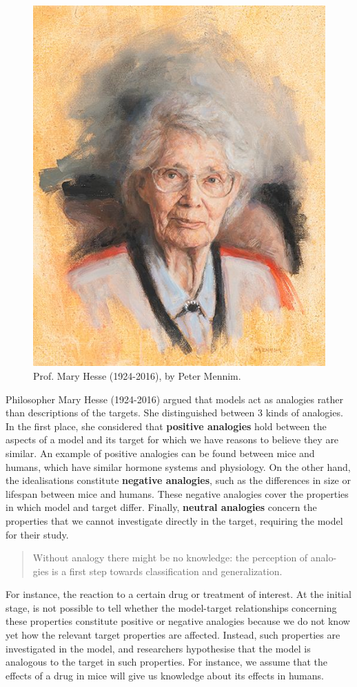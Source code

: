 \documentclass[
]{book}
\begin{document}
\begin{figure}  
 \begin{center}
    \includegraphics[width=.33\textwidth]{Figures/mary-hesse.jpeg}  
  \captionsetup{labelformat=empty}
  \caption{Prof. Mary Hesse (1924-2016), by Peter Mennim.} 
\end{center}
\end{figure}
\addtocounter{figure}{-1}

Philosopher Mary Hesse (1924-2016) argued that models act as analogies rather than descriptions of the targets. She distinguished between 3 kinds of analogies. In the first place, she considered that \textbf{positive analogies} hold between the aspects of a model and its target for which we have reasons to believe they are similar. An example of positive analogies can be found between mice and humans, which have similar hormone systems and physiology. On the other hand, the idealisations constitute \textbf{negative analogies}, such as the differences in size or lifespan between mice and humans. These negative analogies cover the properties in which model and target differ. Finally, \textbf{neutral analogies} concern the properties that we cannot investigate directly in the target, requiring the model for their study.

\begin{quote}
Without analogy there might be no knowledge: the perception of analo- gies is a first step towards classification and generalization. \citep{bunge2012method}
\end{quote}

For instance, the reaction to a certain drug or treatment of interest. At the initial stage, is not possible to tell whether the model-target relationships concerning these properties constitute positive or negative analogies because we do not know yet how the relevant target properties are affected. Instead, such properties are investigated in the model, and researchers hypothesise that the model is analogous to the target in such properties. For instance, we assume that the effects of a drug in mice will give us knowledge about its effects in humans.
\end{document}
